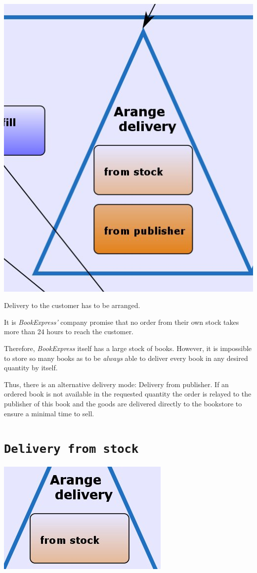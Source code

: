 \includegraphics[scale=0.8]{screenshots/Arange_delivery.jpeg}

Delivery to the customer has to be arranged.

It is \emph{BookExpress'} company promise that no order from their own stock takes more than 24 hours to reach the customer.

Therefore, \emph{BookExpress} itself has a large stock of books. However, it is impossible to store so many books as to be \emph{always}
able to deliver every book in any desired quantity by itself.

Thus, there is an alternative delivery mode: Delivery from publisher. If an ordered book is not available in the requested quantity
the order is relayed to the publisher of this book and the goods are delivered directly to the bookstore to ensure a minimal time to sell.

\section{\texttt{Delivery from stock}}

\includegraphics[scale=0.8]{screenshots/Arange_delivery_from_stock.jpeg}

